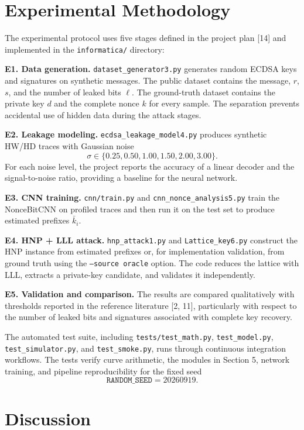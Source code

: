 \documentclass[11pt,a4paper]{article}
\begin{document}
\section{Experimental Methodology}

The experimental protocol uses five stages defined in the project plan [14] and implemented in the \texttt{informatica/} directory:

\textbf{E1. Data generation.}
\texttt{dataset\_generator3.py} generates random ECDSA keys and signatures on synthetic messages. The public dataset contains the message, $r$, $s$, and the number of leaked bits $\ell$. The ground-truth dataset contains the private key $d$ and the complete nonce $k$ for every sample. The separation prevents accidental use of hidden data during the attack stages.

\textbf{E2. Leakage modeling.}
\texttt{ecdsa\_leakage\_model4.py} produces synthetic HW/HD traces with Gaussian noise
\[
\sigma\in\{0.25,0.50,1.00,1.50,2.00,3.00\}.
\]
For each noise level, the project reports the accuracy of a linear decoder and the signal-to-noise ratio, providing a baseline for the neural network.

\textbf{E3. CNN training.}
\texttt{cnn/train.py} and \texttt{cnn\_nonce\_analysis5.py} train the NonceBitCNN on profiled traces and then run it on the test set to produce estimated prefixes $\bar{k}_i$.

\textbf{E4. HNP + LLL attack.}
\texttt{hnp\_attack1.py} and \texttt{Lattice\_key6.py} construct the HNP instance from estimated prefixes or, for implementation validation, from ground truth using the \texttt{--source oracle} option. The code reduces the lattice with LLL, extracts a private-key candidate, and validates it independently.

\textbf{E5. Validation and comparison.}
The results are compared qualitatively with thresholds reported in the reference literature [2, 11], particularly with respect to the number of leaked bits and signatures associated with complete key recovery.

The automated test suite, including \texttt{tests/test\_math.py}, \texttt{test\_model.py}, \texttt{test\_simulator.py}, and \texttt{test\_smoke.py}, runs through continuous integration workflows. The tests verify curve arithmetic, the modules in Section 5, network training, and pipeline reproducibility for the fixed seed
\[
\texttt{RANDOM\_SEED}=20260919.
\]

\section{Discussion}
\end{document}
